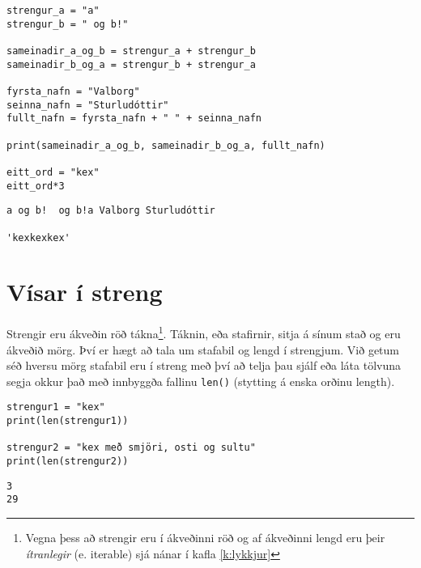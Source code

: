 \begin{lstlisting}[caption=Samskeyting og lenging strengja, label=lst:str-conmul]
strengur_a = "a"
strengur_b = " og b!"

sameinadir_a_og_b = strengur_a + strengur_b
sameinadir_b_og_a = strengur_b + strengur_a

fyrsta_nafn = "Valborg"
seinna_nafn = "Sturludóttir"
fullt_nafn = fyrsta_nafn + " " + seinna_nafn

print(sameinadir_a_og_b, sameinadir_b_og_a, fullt_nafn)

eitt_ord = "kex"
eitt_ord*3
\end{lstlisting}
\lstset{style=uttak}
\begin{lstlisting}
a og b!  og b!a Valborg Sturludóttir

'kexkexkex'
\end{lstlisting}
\lstset{style=venjulegt}

\section{Vísar í streng}
Strengir eru ákveðin röð tákna\footnote{Vegna þess að strengir eru í ákveðinni röð og af ákveðinni lengd eru þeir \emph{ítranlegir} (e. iterable) sjá nánar í kafla \ref{k:lykkjur}}.
Táknin, eða stafirnir, sitja á sínum stað og eru ákveðið mörg.
Því er hægt að tala um stafabil og lengd í strengjum.
Við getum séð hversu mörg stafabil eru í streng með því að telja þau sjálf eða láta tölvuna segja okkur það með innbyggða fallinu \texttt{len()} (stytting á enska orðinu length).

\begin{lstlisting}[caption=Stafabilafjöldi, label=lst:str-stafabil]
strengur1 = "kex"
print(len(strengur1))

strengur2 = "kex með smjöri, osti og sultu"
print(len(strengur2))
\end{lstlisting}
\lstset{style=uttak}
\begin{lstlisting}
3
29
\end{lstlisting}
\lstset{style=venjulegt}

